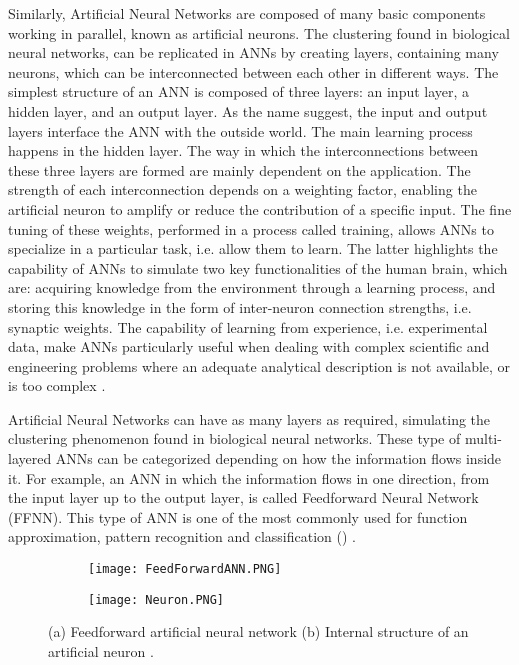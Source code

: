Similarly, Artificial Neural Networks are composed of many basic components working in parallel, known as artificial neurons. The clustering found in biological neural networks, can be replicated in ANNs by creating layers, containing many neurons, which can be interconnected between each other in different ways. The simplest structure of an ANN is composed of three layers: an input layer, a hidden layer, and an output layer. As the name suggest, the input and output layers interface the ANN with the outside world. The main learning process happens in the hidden layer. The way in which the interconnections between these three layers are formed are mainly dependent on the application. The strength of each interconnection depends on a weighting factor, enabling the artificial neuron to amplify or reduce the contribution of a specific input. The fine tuning of these weights, performed in a process called training, allows ANNs to specialize in a particular task, i.e. allow them to learn. The latter highlights the capability of ANNs to simulate two key functionalities of the human brain, which are: acquiring knowledge from the environment through a learning process, and storing this knowledge in the form of inter-neuron connection strengths, i.e. synaptic weights. The capability of learning from experience, i.e. experimental data, make ANNs particularly useful when dealing with complex scientific and engineering problems where an adequate analytical description is not available, or is too complex  \cite{zhang2003artificial,trebar2007predicting}.

Artificial Neural Networks can have as many layers as required, simulating the clustering phenomenon found in biological neural networks. These type of multi-layered ANNs can be categorized depending on how the information flows inside it. For example, an ANN in which the information flows in one direction, from the input layer up to the output layer, is called Feedforward Neural Network (FFNN). This type of ANN is one of the most commonly used for function approximation, pattern recognition and classification () \cite{zhang2003artificial}.

\begin{figure}[htb!]
	\centering
    \begin{subfigure}[b]{0.49\textwidth}
        \centering
        \texttt{[image: FeedForwardANN.PNG]}
        \caption{}
        \label{fig:FFANN}
    \end{subfigure}
    \begin{subfigure}[b]{0.49\textwidth}
        \centering
        \texttt{[image: Neuron.PNG]}
        \caption{}
        \label{fig:neuron}
    \end{subfigure}
    \caption[(a) Feedforward artificial neural network (b) Internal structure of an artificial neuron.]{(a) Feedforward artificial neural network (b) Internal structure of an artificial neuron \cite{rodriguez2019application}.}
    \label{fig:neruonANN}
\end{figure}

